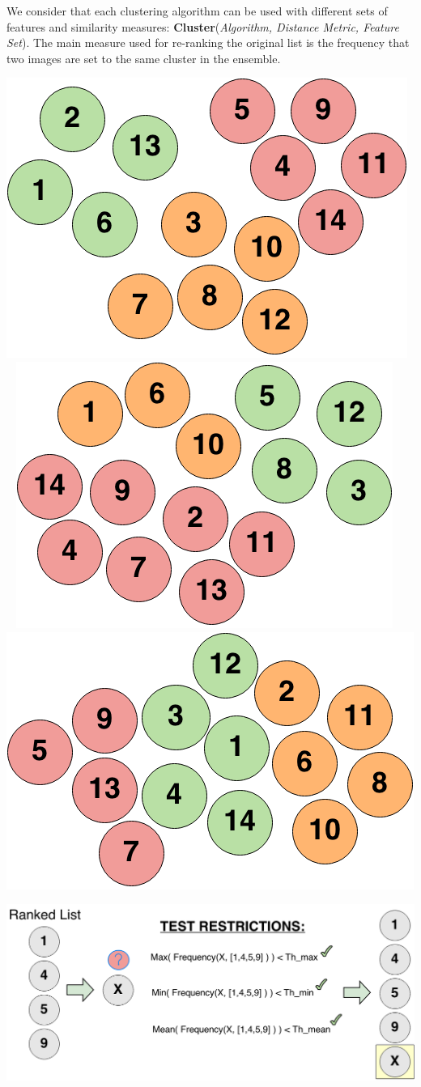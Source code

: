 \documentclass[a0,portrait]{a0poster}
\begin{document}
\begin{multicols}{2}
We consider that each clustering algorithm can be used with different sets of features and similarity measures: \textbf{Cluster}(\textit{Algorithm, Distance Metric, Feature Set}).
The main measure used for re-ranking the original list is the frequency that two images are set to the same cluster in the ensemble.


\begin{center}\vspace{0.5cm}
\includegraphics[width=.3\linewidth]{cluster1.png} ~
\includegraphics[width=.3\linewidth]{cluster2.png} ~
\includegraphics[width=.3\linewidth]{cluster3.png}
\end{center}%

\begin{center}%
\includegraphics[width=0.8\linewidth]{poster.png} 
\end{center} %



\end{multicols}
\end{document}
